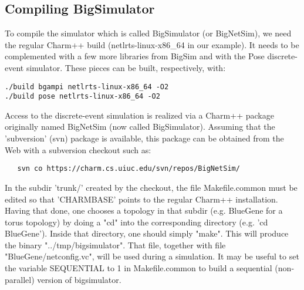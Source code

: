 \subsection{Compiling BigSimulator}

To compile the simulator which is called BigSimulator (or BigNetSim), we need
the regular Charm++ build (netlrts-linux-x86\_64 in our example).  It needs to be
complemented with a few more libraries from BigSim and with the Pose
discrete-event simulator. These pieces can be built, respectively, with:

\begin{verbatim}
./build bgampi netlrts-linux-x86_64 -O2
./build pose netlrts-linux-x86_64 -O2
\end{verbatim}

Access to the discrete-event simulation is realized via a Charm++ package
originally named BigNetSim (now called BigSimulator). Assuming that the
'subversion' (svn) package is available, this package can be obtained from the
Web with a subversion checkout such as:

\begin{verbatim}
   svn co https://charm.cs.uiuc.edu/svn/repos/BigNetSim/
\end{verbatim}

In the subdir 'trunk/' created by the checkout, the file Makefile.common must
be edited so that 'CHARMBASE' points to the regular Charm++ installation.
Having that done, one chooses a topology in that subdir (e.g. BlueGene for a
torus topology) by doing a "cd" into the corresponding directory (e.g. 'cd
BlueGene').  Inside that directory, one should simply "make". This will produce
the binary "../tmp/bigsimulator". That file, together with file
"BlueGene/netconfig.vc", will be used during a simulation. It may be useful to
set the variable SEQUENTIAL to 1 in Makefile.common to build a sequential
(non-parallel) version of bigsimulator.

